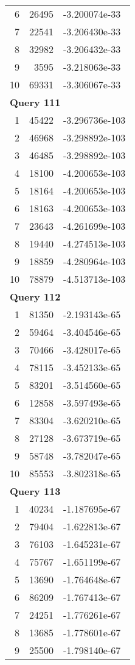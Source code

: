 \begin{longtable}[{p}]{@{}rrp{}@{}}
6 & 26495 & -3.200074e-33 \\
7 & 22541 & -3.206430e-33 \\
8 & 32982 & -3.206432e-33 \\
9 & 3595 & -3.218063e-33 \\
10 & 69331 & -3.306067e-33 \\
\midrule
\multicolumn{3}{l}{\bfseries Query 111} \\
1 & 45422 & -3.296736e-103 \\
2 & 46968 & -3.298892e-103 \\
3 & 46485 & -3.298892e-103 \\
4 & 18100 & -4.200653e-103 \\
5 & 18164 & -4.200653e-103 \\
6 & 18163 & -4.200653e-103 \\
7 & 23643 & -4.261699e-103 \\
8 & 19440 & -4.274513e-103 \\
9 & 18859 & -4.280964e-103 \\
10 & 78879 & -4.513713e-103 \\
\midrule
\multicolumn{3}{l}{\bfseries Query 112} \\
1 & 81350 & -2.193143e-65 \\
2 & 59464 & -3.404546e-65 \\
3 & 70466 & -3.428017e-65 \\
4 & 78115 & -3.452133e-65 \\
5 & 83201 & -3.514560e-65 \\
6 & 12858 & -3.597493e-65 \\
7 & 83304 & -3.620210e-65 \\
8 & 27128 & -3.673719e-65 \\
9 & 58748 & -3.782047e-65 \\
10 & 85553 & -3.802318e-65 \\
\midrule
\multicolumn{3}{l}{\bfseries Query 113} \\
1 & 40234 & -1.187695e-67 \\
2 & 79404 & -1.622813e-67 \\
3 & 76103 & -1.645231e-67 \\
4 & 75767 & -1.651199e-67 \\
5 & 13690 & -1.764648e-67 \\
6 & 86209 & -1.767413e-67 \\
7 & 24251 & -1.776261e-67 \\
8 & 13685 & -1.778601e-67 \\
9 & 25500 & -1.798140e-67 \\

\end{longtable}
